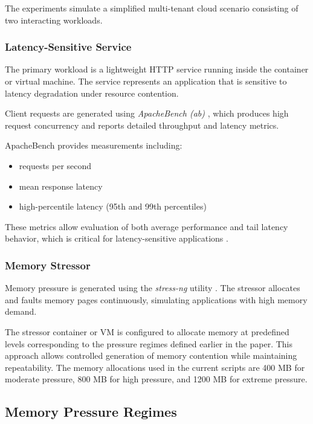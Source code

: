 \documentclass[conference]{IEEEtran}
\begin{document}
The experiments simulate a simplified multi-tenant cloud scenario consisting of two interacting workloads.

\subsubsection{Latency-Sensitive Service}

The primary workload is a lightweight HTTP service running inside the container or virtual machine. The service represents an application that is sensitive to latency degradation under resource contention.

Client requests are generated using \textit{ApacheBench (ab)} \cite{apachebench}, which produces high request concurrency and reports detailed throughput and latency metrics.

ApacheBench provides measurements including:

\begin{itemize}
\item requests per second
\item mean response latency
\item high-percentile latency (95th and 99th percentiles)
\end{itemize}

These metrics allow evaluation of both average performance and tail latency behavior, which is critical for latency-sensitive applications \cite{dean2013tail}.

\subsubsection{Memory Stressor}

Memory pressure is generated using the \textit{stress-ng} utility \cite{stressng}. The stressor allocates and faults memory pages continuously, simulating applications with high memory demand.

The stressor container or VM is configured to allocate memory at predefined levels corresponding to the pressure regimes defined earlier in the paper. This approach allows controlled generation of memory contention while maintaining repeatability. The memory allocations used in the current scripts are 400 MB for moderate pressure, 800 MB for high pressure, and 1200 MB for extreme pressure.

\subsection{Memory Pressure Regimes}
\end{document}
